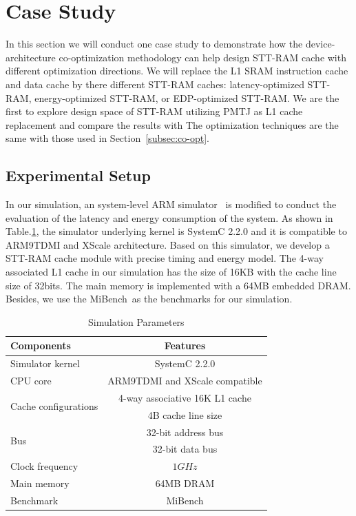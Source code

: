 \section{Case Study} \label{sec:case}
In this section we will conduct one case study to demonstrate how the device-architecture co-optimization methodology can help design STT-RAM cache with different optimization directions. We will replace the L1 SRAM instruction cache and data cache by there different STT-RAM caches: latency-optimized STT-RAM, energy-optimized STT-RAM, or EDP-optimized STT-RAM. We are the first to explore design space of STT-RAM utilizing PMTJ as L1 cache replacement and compare the results with The optimization techniques are the same with those used in Section~\ref{subsec:co-opt}.

\subsection{Experimental Setup}
In our simulation, an system-level ARM simulator~\cite{?} is modified to conduct the evaluation of the latency and energy consumption of the system. As shown in Table.\ref{tb:parameters}, the simulator underlying kernel is SystemC 2.2.0 and it is compatible to ARM9TDMI and XScale architecture. Based on this simulator, we develop a STT-RAM cache module with precise timing and energy model. The 4-way associated  L1 cache in our simulation has the size of 16KB with the cache line size of 32bits. The main memory is implemented with a 64MB embedded DRAM. Besides, we use the MiBench~\cite{??}as the benchmarks for our simulation.

\begin{table}[t]
\centering
\caption{Simulation Parameters}
\label{tb:parameters}
\vspace{-5pt}
\begin{tabular}{ l | c }
\hline \hline
Components & Features\\
\hline
Simulator kernel & SystemC 2.2.0\\
\hline
CPU core & ARM9TDMI and XScale compatible \\
\hline
\multirow{2}{*}{Cache configurations} & 4-way associative 16K L1 cache  \\
& 4B cache line size \\
\hline
\multirow{2}{*}{Bus} & 32-bit address bus  \\
& 32-bit data bus \\
\hline
Clock frequency & $1GHz$ \\
\hline
Main memory & 64MB DRAM \\
\hline
Benchmark & MiBench \\
\hline\hline
\end{tabular}
\vspace{-10pt}
\end{table}

